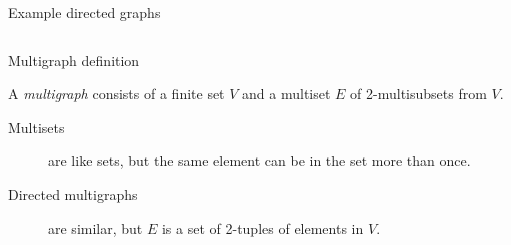 \begin{frame}{Example directed graphs}
	\vspace{5mm}
	\begin{columns}
		\begin{column}{0.45\textwidth}
			\begin{center}
				\begin{adjustbox}{max width={0.9\textwidth}, center}
				\end{adjustbox}
			\end{center}
		\end{column}
				\begin{column}{0.45\textwidth}
			\begin{center}
				\begin{adjustbox}{max width={0.9\textwidth}, center}
				\end{adjustbox}
			\end{center}
		\end{column}
	\end{columns}
\end{frame}



\begin{frame}{Multigraph definition}
	\begin{definition}
	A \emph{multigraph} consists of a finite set $V$ and a multiset $E$ of 2-multisubsets from $V$.
	\end{definition}
	\vspace{0.2cm}
	\begin{description}
		\item[Multisets] are like sets, but the same element can be in the set more than once.
		\item[Directed multigraphs] are similar, but $E$ is a set of 2-tuples of elements in $V$.
	\end{description}
\end{frame}

